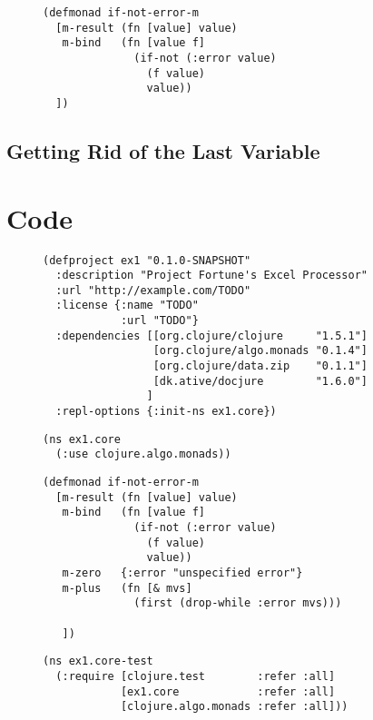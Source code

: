 \documentclass[11pt]{article}
\begin{document}
\begin{figure}[H]
\label{if-not-error-monad}
\begin{verbatim}
(defmonad if-not-error-m
  [m-result (fn [value] value)
   m-bind   (fn [value f]
              (if-not (:error value)
                (f value) 
                value))
  ])
\end{verbatim}
\end{figure}
\subsection{Getting Rid of the Last Variable}
\label{sec-3-3}


\section{Code}
\label{sec-4}

\begin{figure}[H]
\label{project-file}
\begin{verbatim}
(defproject ex1 "0.1.0-SNAPSHOT"
  :description "Project Fortune's Excel Processor"
  :url "http://example.com/TODO"
  :license {:name "TODO"
            :url "TODO"}
  :dependencies [[org.clojure/clojure     "1.5.1"]
                 [org.clojure/algo.monads "0.1.4"]
                 [org.clojure/data.zip    "0.1.1"]
                 [dk.ative/docjure        "1.6.0"]
                ]
  :repl-options {:init-ns ex1.core})
\end{verbatim}
\end{figure}

\begin{figure}[H]
\label{main-namespace}
\begin{verbatim}
(ns ex1.core
  (:use clojure.algo.monads))
\end{verbatim}
\end{figure}

\begin{figure}[H]
\label{main-monad}
\begin{verbatim}
(defmonad if-not-error-m
  [m-result (fn [value] value)
   m-bind   (fn [value f]
              (if-not (:error value)
                (f value) 
                value))
   m-zero   {:error "unspecified error"}
   m-plus   (fn [& mvs]
              (first (drop-while :error mvs)))

   ])
\end{verbatim}
\end{figure}

\begin{figure}[H]
\label{main-test-namespace}
\begin{verbatim}
(ns ex1.core-test
  (:require [clojure.test        :refer :all]
            [ex1.core            :refer :all]
            [clojure.algo.monads :refer :all]))
\end{verbatim}
\end{figure}
\end{document}
